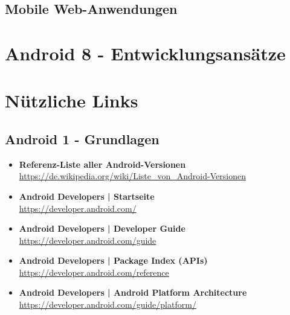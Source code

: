 \documentclass[a4paper]{article}
\begin{document}
	\subsection{Mobile Web-Anwendungen}
	
	

\section{Android 8 - Entwicklungsansätze}

	
	
	
\newpage
	
\section{Nützliche Links}

	\subsection{Android 1 - Grundlagen}
	
	\begin{itemize}
		\item \textbf{Referenz-Liste aller Android-Versionen}\\
		\href{https://de.wikipedia.org/wiki/Liste_von_Android-Versionen}
		{https://de.wikipedia.org/wiki/Liste\_von\_Android-Versionen}
		
		\item \textbf{Android Developers | Startseite}\\
		\href{https://developer.android.com/}
		{https://developer.android.com/}
		
		\item \textbf{Android Developers | Developer Guide}\\
		\href{https://developer.android.com/guide}
		{https://developer.android.com/guide}
		
		\item \textbf{Android Developers | Package Index (APIs)}\\
		\href{https://developer.android.com/reference
		}{https://developer.android.com/reference}
		
		\item \textbf{Android Developers | Android Platform Architecture}\\
		\href{https://developer.android.com/guide/platform/}
		{https://developer.android.com/guide/platform/}
	\end{itemize}
	
\end{document}
